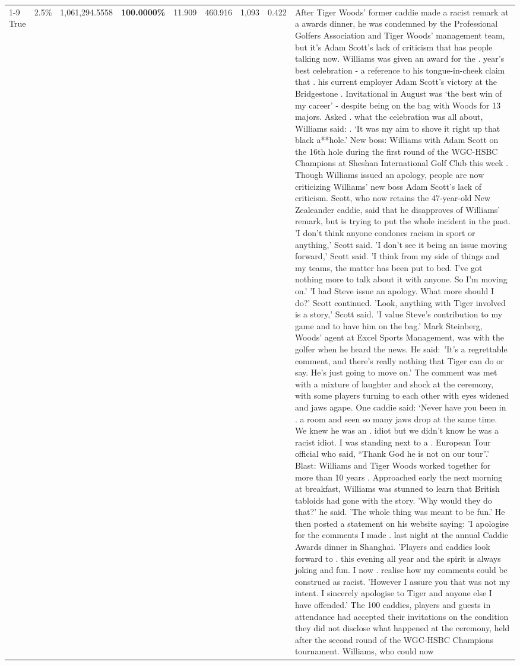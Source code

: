 \begin{table}[H]
\begin{tabular}{lllrlllll}
 \\
\cline{1-9}
True & 2.5\% & 1,061,294.5558 & \bfseries \color{red} 100.0000\% & 11.909 & 460.916 & 1,093 & 0.422 & After Tiger Woods' former caddie made a racist remark at a awards dinner, he was condemned by the Professional Golfers Association and Tiger Woods' management team, but it's Adam Scott's lack of criticism that has people talking now. Williams was given an award for the . year’s best celebration - a reference to his tongue-in-cheek claim that . his current employer Adam Scott’s victory at the Bridgestone . Invitational in August was ‘the best win of my career’ - despite being on the bag with Woods for 13 majors. Asked . what the celebration was all about, Williams said: . ‘It was my aim to shove it right up that black a**hole.’ New boss: Williams with Adam Scott  on the 16th hole during the first round of the WGC-HSBC Champions at Sheshan International Golf Club this week . Though Williams issued an apology, people are now criticizing Williams' new boss Adam Scott's lack of criticism. Scott, who now retains the 47-year-old New Zealeander caddie, said that he disapproves of Williams' remark, but is trying to put the whole incident in the past. 'I don't think anyone condones racism in sport or anything,' Scott said. 'I don't see it being an issue moving forward,' Scott said. 'I think from my side of things and my teams, the matter has been put to bed. I've got nothing more to talk about it with anyone. So I'm moving on.' 'I had Steve issue an apology. What more should I do?' Scott continued. 'Look, anything with Tiger involved is a story,' Scott said. 'I value Steve's contribution to my game and to have him on the bag.' Mark Steinberg, Woods' agent at Excel Sports Management, was with the golfer when he heard the news. He said: 'It's a regrettable comment, and there's really nothing that Tiger can do or say. He's just going to move on.' The comment was met with a mixture of laughter and shock at the ceremony, with some players turning to each other with eyes widened and jaws agape. One caddie said: ‘Never have you been in . a room and seen so many jaws drop at the same time. We knew he was an . idiot but we didn’t know he was a racist idiot. I was standing next to a . European Tour official who said, “Thank God he is not on our tour”.’ Blast: Williams and Tiger Woods worked together for more than 10 years . Approached early the next morning at breakfast, Williams was stunned to learn that British tabloids had gone with the story. 'Why would they do that?' he said. 'The whole thing was meant to be fun.' He then posted a statement on his website saying: 'I apologise for the comments I made . last night at the annual Caddie Awards dinner in Shanghai. 'Players and caddies look forward to . this evening all year and the spirit is always joking and fun. I now . realise how my comments could be construed as racist. 'However I assure you that was not my intent. I sincerely apologise to Tiger and anyone else I have offended.' The 100 caddies, players and guests in attendance had accepted their invitations on the condition they did not disclose what happened at the ceremony, held after the second round of the WGC-HSBC Champions tournament. Williams, who could now 
\end{tabular}
\end{table}
